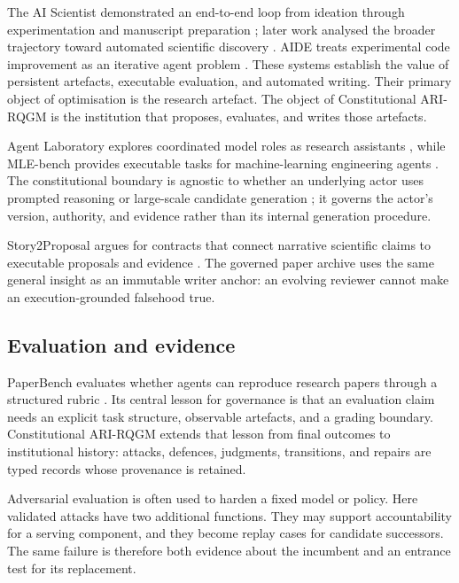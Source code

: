The AI Scientist demonstrated an end-to-end loop from ideation through
experimentation and manuscript preparation \cite{lu2024ai}; later work
analysed the broader trajectory toward automated scientific discovery
\cite{lu2026towards}. AIDE treats experimental code improvement as an
iterative agent problem \cite{jiang2025aide}. These systems establish the
value of persistent artefacts, executable evaluation, and automated
writing. Their primary object of optimisation is the research artefact.
The object of Constitutional ARI-RQGM is the institution that proposes,
evaluates, and writes those artefacts.

Agent Laboratory explores coordinated model roles as research assistants
\cite{schmidgall2025agent}, while MLE-bench provides executable tasks for
machine-learning engineering agents \cite{chan2024mle}. The constitutional
boundary is agnostic to whether an underlying actor uses prompted
reasoning \cite{wei2022chain} or large-scale candidate generation
\cite{li2022competition}; it governs the actor's version, authority, and
evidence rather than its internal generation procedure.

Story2Proposal argues for contracts that connect narrative scientific
claims to executable proposals and evidence \cite{qian2026story2proposal}.
The governed paper archive uses the same general insight as an immutable
writer anchor: an evolving reviewer cannot make an execution-grounded
falsehood true.

\subsection{Evaluation and evidence}\label{sec:related:eval}

PaperBench evaluates whether agents can reproduce research papers through
a structured rubric \cite{starace2025paperbench}. Its central lesson for
governance is that an evaluation claim needs an explicit task structure,
observable artefacts, and a grading boundary. Constitutional ARI-RQGM
extends that lesson from final outcomes to institutional history: attacks,
defences, judgments, transitions, and repairs are typed records whose
provenance is retained.

Adversarial evaluation is often used to harden a fixed model or policy.
Here validated attacks have two additional functions. They may support
accountability for a serving component, and they become replay cases for
candidate successors. The same failure is therefore both evidence about
the incumbent and an entrance test for its replacement.

